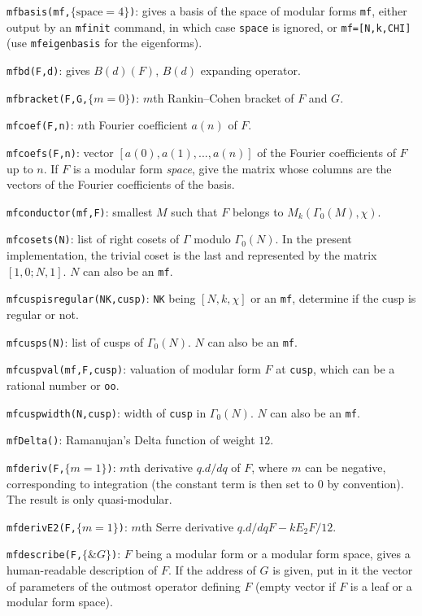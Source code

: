 \documentclass[11pt]{article}
\newcommand{\G}{\Gamma}
\def\kbd#1{{\tt #1}}
\begin{document}
\f\kbd{mfbasis(mf,$\{\text{space}=4\}$)}: gives a basis of the space of
modular forms \kbd{mf}, either output by an \kbd{mfinit} command, in which
case \kbd{space} is ignored, or \kbd{mf=[N,k,CHI]} (use \kbd{mfeigenbasis}
for the eigenforms).

\f\kbd{mfbd(F,d)}: gives $B(d)(F)$, $B(d)$ expanding operator.

\f\kbd{mfbracket(F,G,$\{m=0\}$)}: $m$th Rankin--Cohen bracket of $F$ and $G$.

\f\kbd{mfcoef(F,n)}: $n$th Fourier coefficient $a(n)$ of $F$.

\f\kbd{mfcoefs(F,n)}: vector $[a(0),a(1),...,a(n)]$ of the Fourier coefficients
of $F$ up to $n$. If $F$ is a modular form \emph{space}, give the matrix
whose columns are the vectors of the Fourier coefficients of the basis.

\f\kbd{mfconductor(mf,F)}: smallest $M$ such that $F$ belongs to
$M_k(\G_0(M),\chi)$.

\f\kbd{mfcosets(N)}: list of right cosets of $\G$ modulo $\G_0(N)$. In the
present implementation, the trivial coset is the last and represented by
the matrix $[1,0;N,1]$. $N$ can also be an \kbd{mf}.

\f\kbd{mfcuspisregular(NK,cusp)}: \kbd{NK} being $[N,k,\chi]$ or an \kbd{mf},
determine if the cusp is regular or not.

\f\kbd{mfcusps(N)}: list of cusps of $\G_0(N)$. $N$ can also be an \kbd{mf}.

\f\kbd{mfcuspval(mf,F,cusp)}: valuation of modular form $F$ at \kbd{cusp}, which
can be a rational number or \kbd{oo}.

\f\kbd{mfcuspwidth(N,cusp)}: width of \kbd{cusp} in $\G_0(N)$. $N$ can also be
an \kbd{mf}.

\f\kbd{mfDelta()}: Ramanujan's Delta function of weight $12$.

\f\kbd{mfderiv(F,$\{m=1\}$)}: $m$th derivative $q.d/dq$ of $F$, where
$m$ can be negative, corresponding to integration (the constant term
is then set to $0$ by convention). The result is only quasi-modular.

\f\kbd{mfderivE2(F,$\{m=1\}$)}: $m$th Serre derivative $q.d/dq F-kE_2F/12$.

\f\kbd{mfdescribe(F,$\{\&G\}$)}: $F$ being a modular form or a modular form
space, gives a human-readable description of $F$. If the address of $G$ is
given, put in it the vector of parameters of the outmost operator defining
$F$ (empty vector if $F$ is a leaf or a modular form space).
\end{document}
